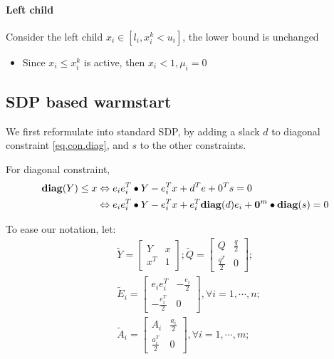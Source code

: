 \documentclass[../main]{subfiles}
\begin{document}
\paragraph{Left child}
Consider the left child \(x_i \in [l_i, x_i^k < u_i]\), the lower bound is unchanged
\begin{itemize}
    \item Since \(x_i \le x_i^k\) is active, then \(x_i < 1, \mu_i = 0\)
\end{itemize}

\subsection{SDP based warmstart}

We first reformulate into standard SDP, by adding a slack \(d\) to diagonal constraint \eqref{eq.con.diag}, and \(s\) to the other constraints.


For diagonal constraint,
\begin{align*}
    \mathbf{diag}(Y) \le x & \Leftrightarrow e_ie_i^T \bullet Y - e_i^T x + d^Te + 0^Ts = 0                                 \\
                   & \Leftrightarrow e_ie_i^T \bullet Y - e_i^T x + e_i^T\mathbf{diag}(d)e_i + \bm 0^m \bullet \mathbf{diag}(s) = 0
\end{align*}

To ease our notation, let:
\begin{align*}
     & \tilde Y = \begin{bmatrix} Y             & x \\ x^T & 1 \end{bmatrix}; \tilde Q = \begin{bmatrix} Q & \frac{q}{2} \\ \frac{q^T}{2} & 0 \end{bmatrix} ; \\
     & \tilde E_i = \begin{bmatrix} e_ie_i^T  & -\frac{e_i}{2} \\ -\frac{e_i^T}{2} & 0 \end{bmatrix}, \forall i=1,\cdots,n;                 \\
     & \tilde A_i = \begin{bmatrix} A_i             & \frac{a_i}{2} \\ \frac{a_i^T}{2} & 0 \end{bmatrix}, \forall i=1,\cdots,m;
\end{align*}
\end{document}
